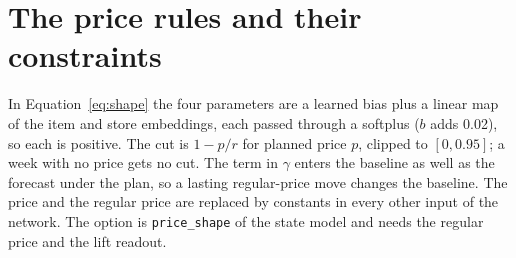 \section{The price rules and their constraints}\label{app:shape}

In Equation~\eqref{eq:shape} the four parameters are a learned bias plus a linear map of the item and store
embeddings, each passed through a softplus ($b$ adds 0.02), so each is positive. The cut is $1 - p/r$ for planned
price $p$, clipped to $[0, 0.95]$; a week with no price gets no cut. The term in $\gamma$ enters the baseline as
well as the forecast under the plan, so a lasting regular-price move changes the baseline. The price and the regular
price are replaced by constants in every other input of the network. The option is \texttt{price\_shape} of the
state model and needs the regular price and the lift readout.
